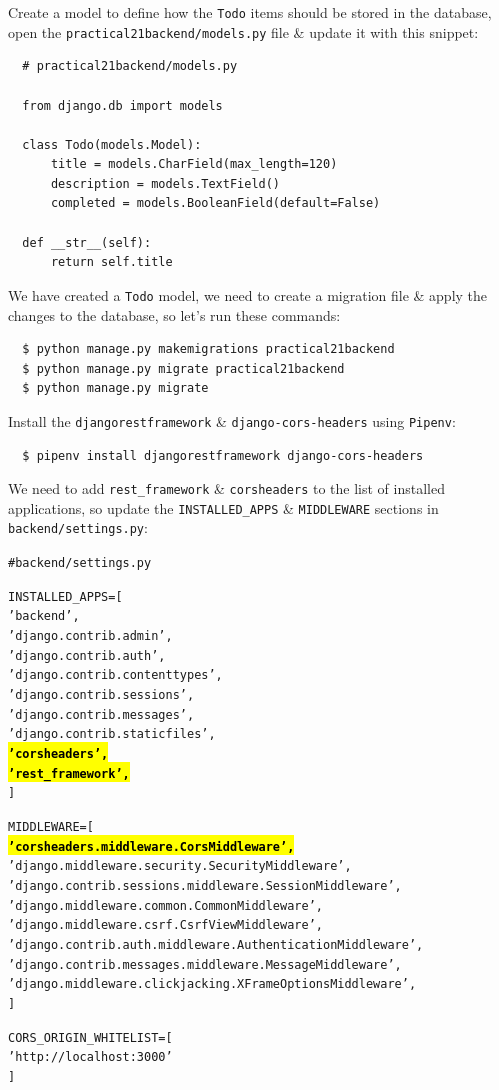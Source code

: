 \documentclass{article}
\begin{document}
Create a model to define how the \texttt{Todo} items should be stored in the database, open the \texttt{practical21backend/models.py} file \& update it with this snippet:

\begin{verbatim}
  # practical21backend/models.py

  from django.db import models

  class Todo(models.Model):
      title = models.CharField(max_length=120)
      description = models.TextField()
      completed = models.BooleanField(default=False)

  def __str__(self):
      return self.title
\end{verbatim}

We have created a \texttt{Todo} model, we need to create a migration file \& apply the changes to the database, so let’s run these commands:

\begin{verbatim}
  $ python manage.py makemigrations practical21backend
  $ python manage.py migrate practical21backend
  $ python manage.py migrate 
\end{verbatim}

Install the \texttt{djangorestframework} \& \texttt{django-cors-headers} using \texttt{Pipenv}:

\begin{verbatim}
  $ pipenv install djangorestframework django-cors-headers
\end{verbatim}

We need to add \texttt{rest\_framework} \& \texttt{corsheaders} to the list of installed applications, so update the \texttt{INSTALLED\_APPS} \& \texttt{MIDDLEWARE} sections in \texttt{backend/settings.py}:

\begin{alltt}
  # backend/settings.py

  INSTALLED_APPS = [
      'backend',
      'django.contrib.admin',
      'django.contrib.auth',
      'django.contrib.contenttypes',
      'django.contrib.sessions',
      'django.contrib.messages',
      'django.contrib.staticfiles',
      \hl{\textbf{'corsheaders',}}                          
      \hl{\textbf{'rest_framework',}}          
  ]

  MIDDLEWARE = [
      \hl{\textbf{'corsheaders.middleware.CorsMiddleware',}} 
      'django.middleware.security.SecurityMiddleware',
      'django.contrib.sessions.middleware.SessionMiddleware',
      'django.middleware.common.CommonMiddleware',
      'django.middleware.csrf.CsrfViewMiddleware',
      'django.contrib.auth.middleware.AuthenticationMiddleware',
      'django.contrib.messages.middleware.MessageMiddleware',
      'django.middleware.clickjacking.XFrameOptionsMiddleware',
  ]

  CORS_ORIGIN_WHITELIST = [
    'http://localhost:3000'
  ]

\end{alltt}
\end{document}
